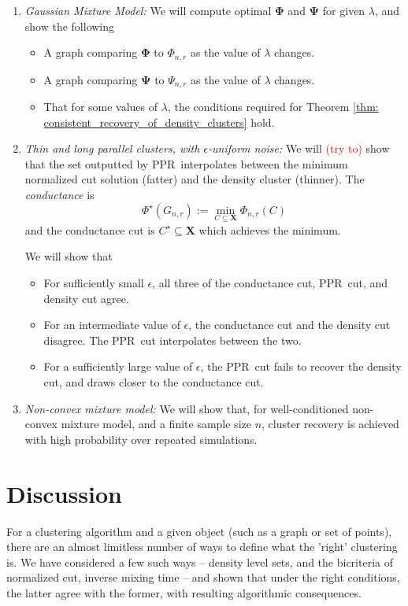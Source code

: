 \documentclass{article}
\newcommand{\1}{\mathbf{1}}
\newcommand{\Phibf}{\mathbf{\Phi}}
\newcommand{\Psibf}{\mathbf{\Psi}}
\newcommand{\Xbf}{\mathbf{X}}
\newcommand{\pprspace}{{\sc PPR~}}
\theoremstyle{aldenthm}
\theoremstyle{aldenrmrk}
\begin{document}
\begin{enumerate}
	\item 
	\textit{Gaussian Mixture Model:} 
	We will compute optimal $\Phibf$ and $\Psibf$ for given $\lambda$, and show the following
	\begin{itemize}
		\item A graph comparing $\Phibf$ to $\Phi_{n,r}$ as the value of $\lambda$ changes.
		\item A graph comparing $\Psibf$ to $\Psi_{n,r}$ as the value of $\lambda$ changes.
		\item That for some values of $\lambda$, the conditions required for Theorem \ref{thm: consistent_recovery_of_density_clusters} hold.
	\end{itemize}

	\item
	\textit{Thin and long parallel clusters, with $\epsilon$-uniform noise: }
	We will \textcolor{red}{(try to)} show that the set outputted by \pprspace interpolates between the minimum normalized cut solution (fatter) and the density cluster (thinner). The \emph{conductance} is
	\begin{equation*}
	\Phi^{\star}(G_{n,r}) := \min_{C \subseteq \Xbf} \Phi_{n,r}(C)
	\end{equation*}
	and the conductance cut is $C^{\star} \subseteq \Xbf$ which achieves the minimum.
	
	We will show that
	\begin{itemize}
		\item For sufficiently small $\epsilon$, all three of the conductance cut, \pprspace cut, and density cut agree.
		\item For an intermediate value of $\epsilon$, the conductance cut and the density cut disagree. The \pprspace cut interpolates between the two.
		\item For a sufficiently large value of $\epsilon$, the \pprspace cut fails to recover the density cut, and draws closer to the conductance cut.
	\end{itemize}

	\item 
	\textit{Non-convex mixture model:} We will show that, for well-conditioned non-convex mixture model, and a finite sample size $n$, cluster recovery is achieved with high probability over repeated simulations.
\end{enumerate}

\section{Discussion}
\label{sec: discussion}
For a clustering algorithm and a given object (such as a graph or set of points), there are an almost limitless number of ways to define what the 'right' clustering is. We have considered a few such ways -- density level sets, and the bicriteria of normalized cut, inverse mixing time -- and shown that under the right conditions, the latter agree with the former, with resulting algorithmic consequences.
\end{document}
